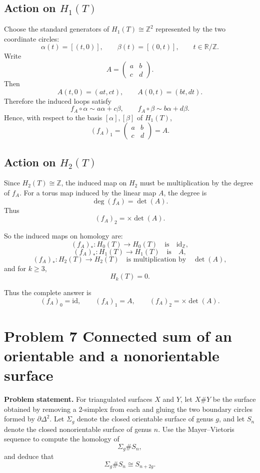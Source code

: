 \documentclass[12pt,a4paper]{article}
\theoremstyle{notespace}
\begin{document}
\subsection*{Action on \(H_1(T)\)}
Choose the standard generators of \(H_1(T)\cong \mathbb Z^2\) represented by the two coordinate circles:
\[
\alpha(t)=[(t,0)],
\qquad
\beta(t)=[(0,t)],
\qquad t\in \mathbb R/\mathbb Z.
\]
Write
\[
A=
\begin{pmatrix}
	a & b\\
	c & d
\end{pmatrix}.
\]
Then
\[
A(t,0)=(at,ct),
\qquad
A(0,t)=(bt,dt).
\]
Therefore the induced loops satisfy
\[
f_A\circ \alpha \sim a\alpha+c\beta,
\qquad
f_A\circ \beta \sim b\alpha+d\beta.
\]
Hence, with respect to the basis \([\alpha],[\beta]\) of \(H_1(T)\),
\[
(f_A)_1=
\begin{pmatrix}
	a & b\\
	c & d
\end{pmatrix}
=A.
\]

\subsection*{Action on \(H_2(T)\)}
Since \(H_2(T)\cong \mathbb Z\), the induced map on \(H_2\) must be multiplication by the degree of \(f_A\). For a torus map induced by the linear map \(A\), the degree is
\[
\deg(f_A)=\det(A).
\]
Thus
\[
(f_A)_2=\times \det(A).
\]

So the induced maps on homology are:
\[
(f_A)_*:H_0(T)\to H_0(T)
\quad\text{is}\quad
\mathrm{id}_{\mathbb Z},
\]
\[
(f_A)_*:H_1(T)\to H_1(T)
\quad\text{is}\quad
A,
\]
\[
(f_A)_*:H_2(T)\to H_2(T)
\quad\text{is multiplication by}\quad
\det(A),
\]
and for \(k\ge 3\),
\[
H_k(T)=0.
\]

Thus the complete answer is
\[
(f_A)_0=\mathrm{id},\qquad
(f_A)_1=A,\qquad
(f_A)_2=\times \det(A).
\]



\section{Problem 7 Connected sum of an orientable and a nonorientable surface}

\textbf{Problem statement.}
For triangulated surfaces \(X\) and \(Y\), let \(X\#Y\) be the surface obtained by removing a \(2\)-simplex from each and gluing the two boundary circles formed by \(\partial\Delta^2\). Let \(\Sigma_g\) denote the closed orientable surface of genus \(g\), and let \(S_n\) denote the closed nonorientable surface of genus \(n\). Use the Mayer--Vietoris sequence to compute the homology of
\[
\Sigma_g\# S_n,
\]
and deduce that
\[
\Sigma_g\# S_n\cong S_{n+2g}.
\]
\end{document}
